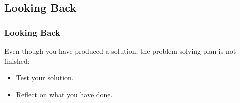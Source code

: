 \documentclass{beamer}
\begin{document}
\subsection{Looking Back}

\begin{frame}%
\frametitle{Looking Back}

Even though you have produced a solution, the problem-solving plan is not finished:
\vspace{0.3cm}
\begin{itemize}
\item<1-> Test your solution.
\vspace{0.5cm}
\item<1-> Reflect on what you have done.
\end{itemize}

\end{frame}









\end{document}
